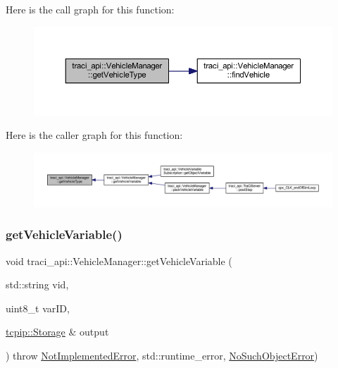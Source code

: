 Here is the call graph for this function\+:\nopagebreak
\begin{figure}[H]
\begin{center}
\leavevmode
\includegraphics[width=350pt]{classtraci__api_1_1_vehicle_manager_a946553555fa7a2a9f95b4baced6f0dbe_cgraph}
\end{center}
\end{figure}
Here is the caller graph for this function\+:\nopagebreak
\begin{figure}[H]
\begin{center}
\leavevmode
\includegraphics[width=350pt]{classtraci__api_1_1_vehicle_manager_a946553555fa7a2a9f95b4baced6f0dbe_icgraph}
\end{center}
\end{figure}
\mbox{\label{classtraci__api_1_1_vehicle_manager_a6926963a4f6914be50a1b75833574249}} 
\subsubsection{\texorpdfstring{get\+Vehicle\+Variable()}{getVehicleVariable()}}
{\footnotesize\ttfamily void traci\+\_\+api\+::\+Vehicle\+Manager\+::get\+Vehicle\+Variable (\begin{DoxyParamCaption}\item[{std\+::string}]{vid,  }\item[{uint8\+\_\+t}]{var\+ID,  }\item[{\hyperlink{classtcpip_1_1_storage}{tcpip\+::\+Storage} \&}]{output }\end{DoxyParamCaption}) throw  \hyperlink{classtraci__api_1_1_not_implemented_error}{Not\+Implemented\+Error},  std\+::runtime\+\_\+error, \hyperlink{classtraci__api_1_1_no_such_object_error}{No\+Such\+Object\+Error}) }

